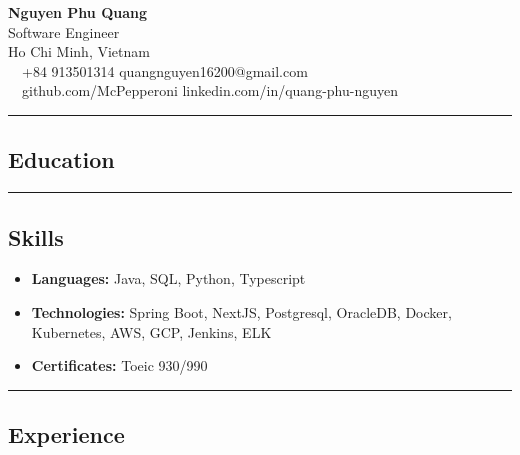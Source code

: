 \documentclass[11pt,letterpaper]{article}
\makeatletter
\newcommand{\headerrow}[2]
{\begin{tabular*}{\linewidth}{l@{\extracolsep{\fill}}r}
#1 &
#2 \\
\end{tabular*}}
\makeatother
\begin{document}
\begin{center}
    {\LARGE \textbf{Nguyen Phu Quang}}\\
    \vspace{0.2cm}
    Software Engineer\\
    \vspace{0.2cm}
    Ho Chi Minh, Vietnam
    \vspace{0.5cm}
    \\
    \raisebox{-0.2\height} {\Large \faPhoneSquare} \ \  +84 913501314 \hfill quangnguyen16200@gmail.com \ \ \raisebox{-0.2\height}{\Large \faEnvelopeSquare}
    \\
    \raisebox{-0.2\height}{\Large \faGithubSquare} \ \ github.com/McPepperoni \hfill linkedin.com/in/quang-phu-nguyen \raisebox{-0.2\height}{\Large \faLinkedinSquare}
\end{center}
\hrule
\vspace{-1em}
\subsection*{\Large Education}

\hrule
\vspace{-1em}
\subsection*{\Large Skills}
\begin{itemize}[leftmargin=1em,noitemsep]
    \item \textbf{Languages:}
          Java, SQL, Python, Typescript
    \item \textbf{Technologies:}
          Spring Boot, NextJS, Postgresql, OracleDB, Docker, Kubernetes, AWS, GCP, Jenkins, ELK
    \item \textbf{Certificates:}
          Toeic 930/990
\end{itemize}
\hrule
\vspace{-1em}
\subsection*{\Large Experience}
\end{document}
